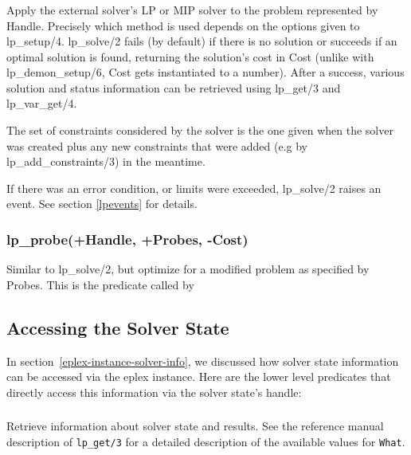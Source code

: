 \subsubsection{}

Apply the external solver's LP or MIP solver to the problem represented by Handle.
Precisely which method is used depends on the options given to lp_setup/4.
lp_solve/2 fails (by default) if there is no solution or succeeds
if an optimal solution is found, returning the solution's cost in Cost
(unlike with lp_demon_setup/6, Cost gets instantiated to a number).
After a success, various solution and status information can be retrieved
using lp_get/3 and lp_var_get/4.

\begin{sloppypar}
The set of constraints considered by the solver is the one given when the
solver was created plus any new constraints that were added
(e.g  by lp_add_constraints/3) in the meantime.
\end{sloppypar}

If there was an error condition, or limits were exceeded,
lp_solve/2 raises an event. See section \ref{lpevents} for details.

\subsubsection{lp_probe(+Handle, +Probes, -Cost)}
Similar to lp_solve/2, but optimize for a modified problem as specified by
Probes. This is the
predicate called by 
\subsection{Accessing the Solver State}

In section~\ref{eplex-instance-solver-info}, we discussed how solver state
information can be accessed via the eplex instance. Here are the lower
level predicates that directly access this information via the solver
state's handle:

\subsubsection{}
Retrieve information about solver state and results. See the reference
manual description of {\tt lp_get/3} for a detailed description of the
available values for {\tt What}.

